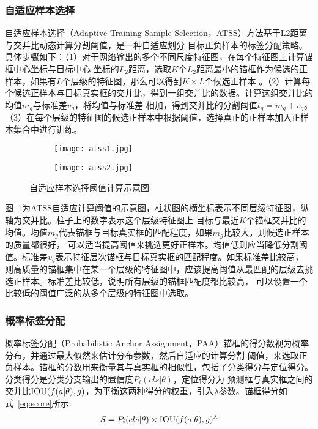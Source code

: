 \subsubsection{自适应样本选择}
自适应样本选择（Adaptive Training Sample Selection，ATSS）方法\cite{zhang2020bridging}基于L2距离与交并比动态计算分割阈值，是一种自适应划分
目标正负样本的标签分配策略。具体步骤如下：（1）对于网络输出的多个不同尺度特征图，在每个特征图上计算锚框中心坐标与目标中心
坐标的$L_2$距离，选取$K$个$L_2$距离最小的锚框作为候选的正样本，如果有$L$个层级的特征图，那么可以得到$K \times L$个候选正样本
。（2）计算每个候选正样本与目标真实框的交并比，得到一组交并比的数据。计算这组交并比的均值$m_g$与标准差$v_g$，将均值与标准差
相加，得到交并比的分割阈值$t_g = m_g + v_g$。（3）在每个层级的特征图的候选正样本中根据阈值，选择真正的正样本加入正样本集合中进行训练。

\begin{figure}[htbp]
	\centering
  \begin{subfigure}{0.48\linewidth}
    \centering
    \texttt{[image: atss1.jpg]}
    \caption{}
  \end{subfigure}
  \begin{subfigure}{0.48\linewidth}
    \centering
    \texttt{[image: atss2.jpg]}
    \caption{}
  \end{subfigure}
\caption{自适应样本选择阈值计算示意图}
	\label{fig:atss}
\end{figure}

图~\ref{fig:atss}为ATSS自适应计算阈值的示意图，柱状图的横坐标表示不同层级特征图，纵轴为交并比。柱子上的数字表示这个层级特征图上
目标与最近$K$个锚框交并比的均值。均值$m_g$代表锚框与目标真实框的匹配程度，如果$m_g$比较大，则候选正样本的质量都很好，
可以适当提高阈值来挑选更好正样本。均值低则应当降低分割阈值。标准差$v_g$表示特征层次锚框与目标真实框的匹配程度。如果标准差比较高，
则高质量的锚框集中在某一个层级的特征图中，应该提高阈值从最匹配的层级去挑选正样本。标准差比较低，说明所有层级的锚框匹配度都比较高，
可以设置一个比较低的阈值广泛的从多个层级的特征图中选取。

\subsubsection{概率标签分配}
概率标签分配（Probabilistic Anchor Assignment，PAA）\cite{kim2020probabilistic}锚框的得分数视为概率分布，并通过最大似然来估计分布参数，然后自适应的计算分割
阈值，来选取正负样本。锚框的分数用来衡量其与真实框的相似性，包括了分类得分与定位得分。分类得分是分类分支输出的置信度${P_i}(cls|\theta )$，定位得分为
预测框与真实框之间的交并比${\rm{IOU}}(f(a|\theta ),g)$，为平衡这两种得分的权重，引入$\lambda$参数。锚框得分如式~\ref{eq:score}所示:
\begin{equation}   
  S = {P_i}(cls|\theta ) \times {\rm{IOU}}{(f(a|\theta ),g)^\lambda } 
  \label{eq:score} 
\end{equation}

